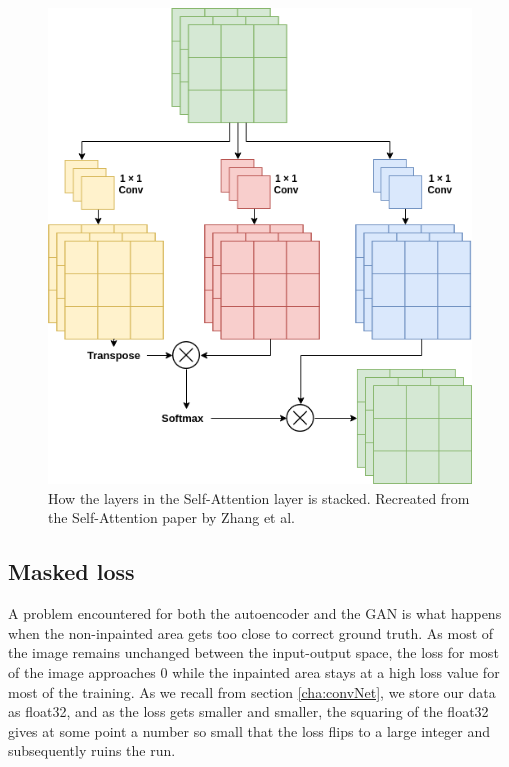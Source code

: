 \begin{figure}[h]
\centering
\includegraphics[scale=0.4]{methodology/figures/attention.png}
\caption{How the layers in the Self-Attention layer is stacked. Recreated from the Self-Attention paper by Zhang et al.~\cite{DBLP:journals/corr/selfattention}}
\label{fig:Attention}
\end{figure}



\subsection{Masked loss}
A problem encountered for both the autoencoder and the GAN is what happens when the non-inpainted area gets too close to correct ground truth. 
As most of the image remains unchanged between the input-output space, the loss for most of the image approaches 0 while the inpainted area stays at a high loss value for most of the training. 
As we recall from section \ref{cha:convNet}, we store our data as float32, and as the loss gets smaller and smaller, the squaring of the float32 gives at some point a number so small that the loss flips to a large integer and subsequently ruins the run. 

